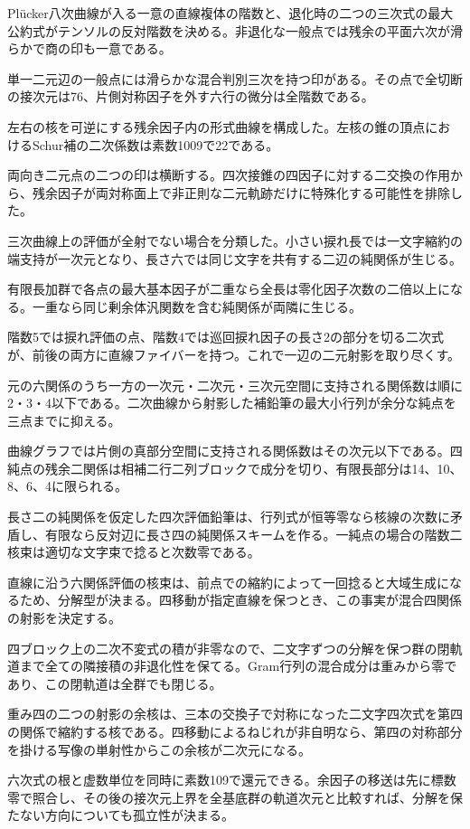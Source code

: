 \documentclass[11pt,a4paper]{ltjsarticle}
\begin{document}
Plücker八次曲線が入る一意の直線複体の階数と、退化時の二つの三次式の最大公約式がテンソルの反対階数を決める。非退化な一般点では残余の平面六次が滑らかで商の印も一意である。

単一二元辺の一般点には滑らかな混合判別三次を持つ印がある。その点で全切断の接次元は76、片側対称因子を外す六行の微分は全階数である。

左右の核を可逆にする残余因子内の形式曲線を構成した。左核の錐の頂点におけるSchur補の二次係数は素数1009で22である。

両向き二元点の二つの印は横断する。四次接錐の四因子に対する二交換の作用から、残余因子が両対称面上で非正則な二元軌跡だけに特殊化する可能性を排除した。

三次曲線上の評価が全射でない場合を分類した。小さい捩れ長では一文字縮約の端支持が一次元となり、長さ六では同じ文字を共有する二辺の純関係が生じる。

有限長加群で各点の最大基本因子が二重なら全長は零化因子次数の二倍以上になる。一重なら同じ剰余体汎関数を含む純関係が両隣に生じる。

階数5では捩れ評価の点、階数4では巡回捩れ因子の長さ2の部分を切る二次式が、前後の両方に直線ファイバーを持つ。これで一辺の二元射影を取り尽くす。

元の六関係のうち一方の一次元・二次元・三次元空間に支持される関係数は順に2・3・4以下である。二次曲線から射影した補鉛筆の最大小行列が余分な純点を三点までに抑える。

曲線グラフでは片側の真部分空間に支持される関係数はその次元以下である。四純点の残余二関係は相補二行二列ブロックで成分を切り、有限長部分は14、10、8、6、4に限られる。

長さ二の純関係を仮定した四次評価鉛筆は、行列式が恒等零なら核線の次数に矛盾し、有限なら反対辺に長さ四の純関係スキームを作る。一純点の場合の階数二核束は適切な文字束で捻ると次数零である。

直線に沿う六関係評価の核束は、前点での縮約によって一回捻ると大域生成になるため、分解型が決まる。四移動が指定直線を保つとき、この事実が混合四関係の射影を決定する。

四ブロック上の二次不変式の積が非零なので、二文字ずつの分解を保つ群の閉軌道まで全ての隣接積の非退化性を保てる。Gram行列の混合成分は重みから零であり、この閉軌道は全群でも閉じる。

重み四の二つの射影の余核は、三本の交換子で対称になった二文字四次式を第四の関係で縮約する核である。四移動によるねじれが非自明なら、第四の対称部分を掛ける写像の単射性からこの余核が二次元になる。

六次式の根と虚数単位を同時に素数109で還元できる。余因子の移送は先に標数零で照合し、その後の接次元上界を全基底群の軌道次元と比較すれば、分解を保たない方向についても孤立性が決まる。
\end{document}
